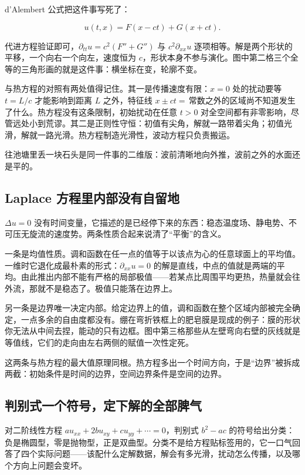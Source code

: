 d'Alembert 公式把这件事写死了：

\[
u(t,x)=F(x-ct)+G(x+ct).
\]

代进方程验证即可，\(\partial_{tt}u=c^2(F''+G'')\) 与 \(c^2\partial_{xx}u\) 逐项相等。解是两个形状的平移，一个向右一个向左，速度恒为 \(c\)，形状本身不参与演化。图中第二格三个全等的三角形画的就是这件事：横坐标在变，轮廓不变。

与热方程的对照有两处值得记住。其一是传播速度有限：\(x=0\) 处的扰动要等 \(t=L/c\) 才能影响到距离 \(L\) 之外，特征线 \(x\pm ct=\)\,常数之外的区域尚不知道发生了什么。热方程没有这条限制，初始扰动在任意 \(t>0\) 对全空间都有非零影响，尽管远处小到荒谬。其二是正则性守恒：初值有尖角，解就一路带着尖角；初值光滑，解就一路光滑。热方程制造光滑性，波动方程只负责搬运。

往池塘里丢一块石头是同一件事的二维版：波前清晰地向外推，波前之外的水面还是平的。

\subsection{Laplace 方程里内部没有自留地}

\(\Delta u=0\) 没有时间变量，它描述的是已经停下来的东西：稳态温度场、静电势、不可压无旋流的速度势。两条性质合起来说清了``平衡''的含义。

一条是均值性质。调和函数在任一点的值等于以该点为心的任意球面上的平均值。一维时它退化成最朴素的形式：\(\partial_{xx}u=0\) 的解是直线，中点的值就是两端的平均。由此推出内部不能有严格的局部极值——若某点比周围平均更热，热量就会往外流，那就不是稳态了。极值只能落在边界上。

另一条是边界唯一决定内部。给定边界上的值，调和函数在整个区域内部被完全确定，一点多余的自由度都没有。绷在弯折铁框上的肥皂膜是现成的例子：膜的形状你无法从中间去捏，能动的只有边框。图中第三格那些从左壁弯向右壁的灰线就是等值线，它们的走向由左右两侧的赋值一次性定死。

这两条与热方程的最大值原理同根。热方程多出一个时间方向，于是``边界''被拆成两截：初始条件是时间的边界，空间边界条件是空间的边界。

\subsection{判别式一个符号，定下解的全部脾气}

对二阶线性方程 \(au_{xx}+2bu_{xy}+cu_{yy}+\cdots=0\)，判别式 \(b^2-ac\) 的符号给出分类：负是椭圆型，零是抛物型，正是双曲型。分类不是给方程贴标签用的，它一口气回答了四个实际问题——该配什么定解数据，解会有多光滑，扰动怎么传播，以及哪个方向上问题会变坏。

